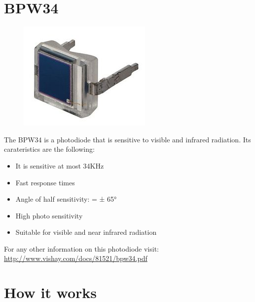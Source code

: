 \documentclass[18pt,oneside,a4paper, titlepage]{article}
\begin{document}
\section{BPW34}
	\begin{figure}[h]
		\centering
		\includegraphics[scale=0.3]{fotodiodo.jpg}
	\end{figure}
	The BPW34 is a photodiode that is sensitive to visible and infrared radiation. Its carateristics are the following:
	\begin{itemize}
		\item It is sensitive at most 34KHz
		\item Fast response times
		\item Angle of half sensitivity: = ± 65°
		\item High photo sensitivity
		\item Suitable for visible and near infrared radiation
	\end{itemize}
	
For any other information on this photodiode visit: \url{http://www.vishay.com/docs/81521/bpw34.pdf}
\newpage
\section{How it works}
\end{document}
